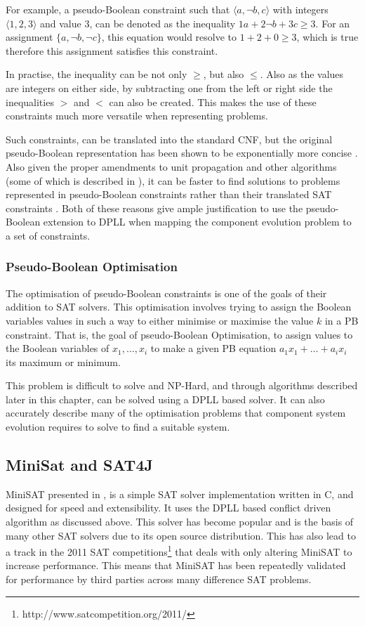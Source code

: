 For example, a pseudo-Boolean constraint such that $\langle a, \neg b , c\rangle$ with integers $\langle 1, 2, 3\rangle$ and value $3$,
can be denoted as the inequality $1a + 2 \neg b + 3c \geq 3$.
For an assignment $\{a , \neg b, \neg c\}$, this equation would resolve to $1 + 2 + 0 \geq 3$, which is true therefore this assignment satisfies this constraint.

In practise, the inequality can be not only $\geq$, but also $\leq$.
Also as the values are integers on either side, by subtracting one from the left or right side the inequalities $>$ and $<$ can also be created.
This makes the use of these constraints much more versatile when representing problems.

Such constraints, can be translated into the standard CNF, but the original pseudo-Boolean representation has been shown to be exponentially more concise \citep{dixon2004automating}.
Also given the proper amendments to unit propagation and other algorithms (some of which is described in \cite{Sheini2006}), 
it can be faster to find solutions to problems represented in pseudo-Boolean constraints rather than their translated SAT constraints \citep{dixon2004automating}.
Both of these reasons give ample justification to use the pseudo-Boolean extension to DPLL when mapping the component evolution problem to a set of constraints. 

\subsubsection{Pseudo-Boolean Optimisation}
The optimisation of pseudo-Boolean constraints is one of the goals of their addition to SAT solvers.
This optimisation involves trying to assign the Boolean variables values in such a way to either minimise or maximise the value $k$ in a PB constraint.
That is, the goal of pseudo-Boolean Optimisation, to assign values to the Boolean variables of $x_1,\ldots,x_i$ to make a given PB equation $a_1x_1 + \ldots + a_ix_i$ its maximum or minimum.

This problem is difficult to solve and NP-Hard, and through algorithms described later in this chapter, can be solved using a DPLL based solver.
It can also accurately describe many of the optimisation problems that component system evolution requires to solve to find a suitable system.

\subsection{MiniSat and SAT4J}
MiniSAT presented in \cite{een2003}, is a simple SAT solver implementation written in C, and designed for speed and extensibility.
It uses the DPLL based conflict driven algorithm as discussed above.
This solver has become popular and is the basis of many other SAT solvers due to its open source distribution.
This has also lead to a track in the 2011 SAT competitions\footnote{http://www.satcompetition.org/2011/} that deals with only altering MiniSAT to increase performance.
This means that MiniSAT has been repeatedly validated for performance by third parties across many difference SAT problems. 

